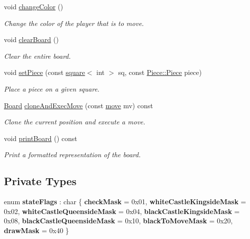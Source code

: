 \begin{DoxyCompactItemize}
\mbox{\label{classBoard_ac33aaf879882d2c1abbab14c9727f2f9}} 
void \hyperlink{classBoard_ac33aaf879882d2c1abbab14c9727f2f9}{change\+Color} ()
\begin{DoxyCompactList}\small\item\em Change the color of the player that is to move. \end{DoxyCompactList}\item 
\mbox{\label{classBoard_a5f148daa03da25d40dff3fc613568d6f}} 
void \hyperlink{classBoard_a5f148daa03da25d40dff3fc613568d6f}{clear\+Board} ()
\begin{DoxyCompactList}\small\item\em Clear the entire board. \end{DoxyCompactList}\item 
\mbox{\label{classBoard_a2a15fa8b4b4db9d11093c6c806344fc6}} 
void \hyperlink{classBoard_a2a15fa8b4b4db9d11093c6c806344fc6}{set\+Piece} (const \hyperlink{structsquare}{square}$<$ int $>$ sq, const \hyperlink{namespacePiece_a588233307aa6bdb32c1d62c9f20895cc}{Piece\+::\+Piece} piece)
\begin{DoxyCompactList}\small\item\em Place a piece on a given square. \end{DoxyCompactList}\item 
\hyperlink{classBoard}{Board} \hyperlink{classBoard_a3eb8e7257733fd3b9e00c8c37b8cc433}{clone\+And\+Exec\+Move} (const \hyperlink{structmove}{move} mv) const
\begin{DoxyCompactList}\small\item\em Clone the current position and execute a move. \end{DoxyCompactList}\item 
void \hyperlink{classBoard_a3f5b48d92226217de5d488f3d5fb234a}{print\+Board} () const
\begin{DoxyCompactList}\small\item\em Print a formatted representation of the board. \end{DoxyCompactList}\end{DoxyCompactItemize}
\subsection*{Private Types}
\begin{DoxyCompactItemize}
\item 
\mbox{\label{classBoard_a6f2173ec700556df381b6623a5482850}} 
enum {\bfseries state\+Flags} \+: char \{ \newline
{\bfseries check\+Mask} = 0x01, 
{\bfseries white\+Castle\+Kingside\+Mask} = 0x02, 
{\bfseries white\+Castle\+Queenside\+Mask} = 0x04, 
{\bfseries black\+Castle\+Kingside\+Mask} = 0x08, 
\newline
{\bfseries black\+Castle\+Queenside\+Mask} = 0x10, 
{\bfseries black\+To\+Move\+Mask} = 0x20, 
{\bfseries draw\+Mask} = 0x40
 \}
\end{DoxyCompactItemize}
